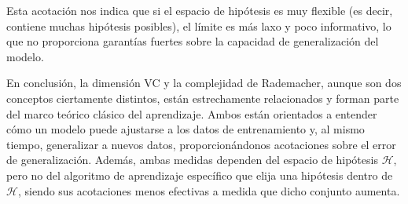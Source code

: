 Esta acotación nos indica que si el espacio de hipótesis es muy flexible (es decir, contiene muchas hipótesis posibles), el límite es más laxo y poco informativo, lo que no proporciona garantías fuertes sobre la capacidad de generalización del modelo.

En conclusión, la dimensión VC y la complejidad de Rademacher, aunque son dos conceptos ciertamente distintos, están estrechamente relacionados y forman parte del marco teórico clásico del aprendizaje. Ambos están orientados a entender cómo un modelo puede ajustarse a los datos de entrenamiento y, al mismo tiempo, generalizar a nuevos datos, proporcionándonos acotaciones sobre el error de generalización. Además, ambas medidas dependen del espacio de hipótesis $\mathcal{H}$, pero no del algoritmo de aprendizaje específico que elija una hipótesis dentro de $\mathcal{H}$, siendo sus acotaciones menos efectivas a medida que dicho conjunto aumenta.

\endinput
